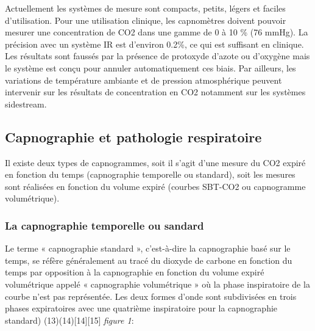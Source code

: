 \documentclass[12pt,]{article}
\begin{document}
Actuellement les systèmes de mesure sont compacts, petits, légers et
faciles d'utilisation. Pour une utilisation clinique, les capnomètres
doivent pouvoir mesurer une concentration de CO2 dans une gamme de 0 à
10 \% (76 mmHg). La précision avec un système IR est d'environ 0.2\%, ce
qui est suffisant en clinique. Les résultats sont faussés par la
présence de protoxyde d'azote ou d'oxygène mais le système est conçu
pour annuler automatiquement ces biais. Par ailleurs, les variations de
température ambiante et de pression atmosphérique peuvent intervenir sur
les résultats de concentration en CO2 notamment sur les systèmes
sidestream.

\subsection{Capnographie et pathologie
respiratoire}\label{capnographie-et-pathologie-respiratoire}

Il existe deux types de capnogrammes, soit il s'agit d'une mesure du CO2
expiré en fonction du temps (capnographie temporelle ou standard), soit
les mesures sont réalisées en fonction du volume expiré (courbes SBT-CO2
ou capnogramme volumétrique).

\subsubsection{La capnographie temporelle ou
sandard}\label{la-capnographie-temporelle-ou-sandard}

Le terme « capnographie standard », c'est-à-dire la capnographie basé
sur le temps, se réfère généralement au tracé du dioxyde de carbone en
fonction du temps par opposition à la capnographie en fonction du volume
expiré volumétrique appelé « capnographie volumétrique » où la phase
inspiratoire de la courbe n'est pas représentée. Les deux formes d'onde
sont subdivisées en trois phases expiratoires avec une quatrième
inspiratoire pour la capnographie standard) (13)(14){[}14{]}{[}15{]}
\emph{figure 1}:
\end{document}
